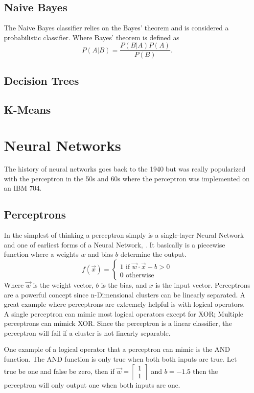 \subsection{Naive Bayes}

The Naive Bayes classifier relies on the Bayes' theorem and is considered a probabilistic classifier. Where Bayes' theorem is defined as $$P(A|B)=\frac{P(B|A)P(A)}{P(B)}.$$

\subsection{Decision Trees}

\subsection{K-Means}

\section{Neural Networks}

The history of neural networks goes back to the 1940 but was really popularized with the perceptron in the 50s and 60s where the perceptron was implemented on an IBM 704.

\subsection{Perceptrons}

In the simplest of thinking a perceptron simply is a single-layer Neural Network and one of earliest forms of a Neural Network, \cite{rosenblatt_1958}. It basically is a piecewise function where a weights $w$ and bias $b$ determine the output. $$f(\vec{x})=\begin{cases}
1 \mbox{ if } \vec{w}\cdot \vec{x}+b>0 \\
0 \mbox{ otherwise }
\end{cases}$$ Where $\vec{w}$  is the weight vector, $b$ is the bias, and $x$ is the input vector.  Perceptrons are a powerful concept since n-Dimensional clusters can be linearly separated. A great example where perceptrons are extremely helpful is with logical operators. A single perceptron can mimic most logical operators except for XOR; Multiple perceptrons can mimick XOR. Since the perceptron is a linear classifier, the perceptron will fail if a cluster is not linearly separable. 

One example of a logical operator that a perceptron can mimic is the AND function. The AND function is only true when both both inputs are true. Let true be one and false be zero, then if $\vec{w}=\begin{bmatrix}1 \\ 1\end{bmatrix}$ and $b=-1.5$ then the perceptron will only output one when both inputs are one.

